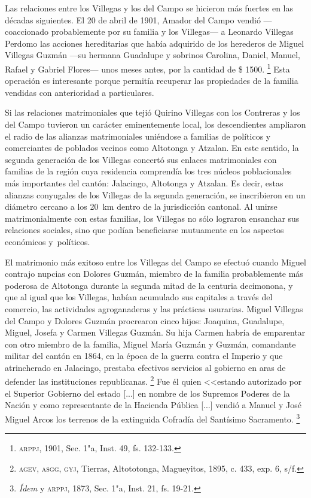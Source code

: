 \documentclass[14pt,twoside,final]{extbook} %
\let\oldfootnote\footnote
\renewcommand\footnote[1]{%
\oldfootnote{\hspace{1mm}#1}}
\begin{document}
Las relaciones entre los Villegas y los del Campo se hicieron más fuertes en las décadas siguientes. El 20 de abril de 1901, Amador del Campo vendió ---coaccionado probablemente por su familia y los Villegas--- a Leonardo Villegas Perdomo las acciones hereditarias que había adquirido de los herederos de Miguel Villegas Guzmán ---su hermana Guadalupe y sobrinos Carolina, Daniel, Manuel, Rafael y Gabriel Flores--- unos meses antes, por la cantidad de \$ 1500.\footnote{\textsc{arppj}, 1901, Sec. 1"a, Inst. 49, fs. 132-133.} Esta operación es interesante porque permitía recuperar las propiedades de la familia vendidas con anterioridad a particulares.

Si las relaciones matrimoniales que tejió Quirino Villegas con los Contreras y los del Campo tuvieron un carácter eminentemente local, los descendientes ampliaron el radio de las alianzas matrimoniales uniéndose a familias de políticos y comerciantes de poblados vecinos como Altotonga y Atzalan. En este sentido, la segunda generación de los Villegas concertó sus enlaces matrimoniales con familias de la región cuya residencia comprendía los tres núcleos poblacionales más importantes del cantón: Jalacingo, Altotonga y Atzalan. Es decir, estas alianzas conyugales de los Villegas de la segunda generación, se inscribieron en un diámetro cercano a los 20~km dentro de la jurisdicción cantonal. Al unirse matrimonialmente con estas familias, los Villegas no sólo lograron ensanchar sus relaciones sociales, sino que podían beneficiarse mutuamente en los aspectos económicos y~políticos.

El matrimonio más exitoso entre los Villegas del Campo se efectuó cuando Miguel contrajo nupcias con Dolores Guzmán, miembro de la familia probablemente más poderosa de Altotonga durante la segunda mitad de la centuria decimonona, y que al igual que los Villegas, habían acumulado sus capitales a través del comercio, las actividades agroganaderas y las prácticas usurarias. Miguel Villegas del Campo y Dolores Guzmán procrearon cinco hijos: Joaquina, Guadalupe, Miguel, Josefa y Carmen Villegas Guzmán. Su hija Carmen habría de emparentar con otro miembro de la familia, Miguel María Guzmán y Guzmán, comandante militar del cantón en 1864, en la época de la guerra contra el Imperio y que atrincherado en Jalacingo, prestaba efectivos servicios al gobierno en aras de defender las instituciones republicanas.\footnote{\textsc{agev, asgg, gyj}, Tierras, Altototonga, Magueyitos, 1895, c. 433, exp. 6, s/f.} Fue él quien <<estando autorizado por el Superior Gobierno del estado [...] en nombre de los Supremos Poderes de la Nación y como representante de la Hacienda Pública [...] vendió a Manuel y José Miguel Arcos los terrenos de la extinguida Cofradía del Santísimo Sacramento.\footnote{\emph{Ídem} y \textsc{arppj}, 1873, Sec. 1"a, Inst. 21, fs. 19-21.}
\end{document}
